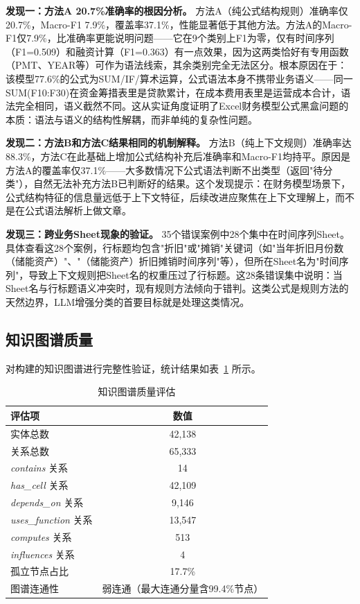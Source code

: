 \textbf{发现一：方法A 20.7\%准确率的根因分析。} 方法A（纯公式结构规则）准确率仅20.7\%，Macro-F1 7.9\%，覆盖率37.1\%，性能显著低于其他方法。方法A的Macro-F1仅7.9\%，比准确率更能说明问题——它在9个类别上F1为零，仅有时间序列（F1=0.509）和融资计算（F1=0.363）有一点效果，因为这两类恰好有专用函数（PMT、YEAR等）可作为语法线索，其余类别完全无法区分。根本原因在于：该模型77.6\%的公式为SUM/IF/算术运算，公式语法本身不携带业务语义——同一SUM(F10:F30)在资金筹措表里是贷款累计，在成本费用表里是运营成本合计，语法完全相同，语义截然不同。这从实证角度证明了Excel财务模型公式黑盒问题的本质：语法与语义的结构性解耦，而非单纯的复杂性问题。

\textbf{发现二：方法B和方法C结果相同的机制解释。} 方法B（纯上下文规则）准确率达88.3\%，方法C在此基础上增加公式结构补充后准确率和Macro-F1均持平。原因是方法A的覆盖率仅37.1\%——大多数情况下公式语法判断不出类型（返回"待分类"），自然无法补充方法B已判断好的结果。这个发现提示：在财务模型场景下，公式结构特征的信息量远低于上下文特征，后续改进应聚焦在上下文理解上，而不是在公式语法解析上做文章。

\textbf{发现三：跨业务Sheet现象的验证。} 35个错误案例中28个集中在时间序列Sheet。具体查看这28个案例，行标题均包含"折旧"或"摊销"关键词（如"当年折旧月份数（储能资产）"、"（储能资产）折旧摊销时间序列"等），但所在Sheet名为"时间序列"，导致上下文规则把Sheet名的权重压过了行标题。这28条错误集中说明：当Sheet名与行标题语义冲突时，现有规则方法倾向于错判。这类公式是规则方法的天然边界，LLM增强分类的首要目标就是处理这类情况。

\subsection{\heiti 知识图谱质量}

对构建的知识图谱进行完整性验证，统计结果如表~\ref{tab:kg_quality} 所示。

\begin{table}[H]
	\centering
	\caption{知识图谱质量评估}
	\label{tab:kg_quality}
	\vspace {-2.5mm}
	\begin{center}
		\begin{tabular}{lc}
			\toprule
			评估项 & 数值 \\
			\hline
			实体总数 & 42,138 \\
			关系总数 & 65,333 \\
			\quad \textit{contains} 关系 & 14 \\
			\quad \textit{has\_cell} 关系 & 42,109 \\
			\quad \textit{depends\_on} 关系 & 9,146 \\
			\quad \textit{uses\_function} 关系 & 13,547 \\
			\quad \textit{computes} 关系 & 513 \\
			\quad \textit{influences} 关系 & 4 \\
			孤立节点占比 & 17.7\% \\
			图谱连通性 & 弱连通（最大连通分量含99.4\%节点） \\
			\bottomrule
		\end{tabular}
	\end{center}
\end{table}


